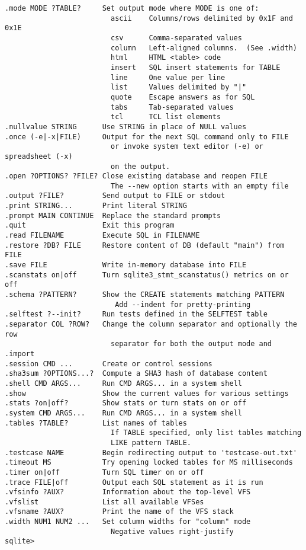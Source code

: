 \begin{verbatim}
.mode MODE ?TABLE?     Set output mode where MODE is one of:
                         ascii    Columns/rows delimited by 0x1F and 0x1E
                         csv      Comma-separated values
                         column   Left-aligned columns.  (See .width)
                         html     HTML <table> code
                         insert   SQL insert statements for TABLE
                         line     One value per line
                         list     Values delimited by "|"
                         quote    Escape answers as for SQL
                         tabs     Tab-separated values
                         tcl      TCL list elements
.nullvalue STRING      Use STRING in place of NULL values
.once (-e|-x|FILE)     Output for the next SQL command only to FILE
                         or invoke system text editor (-e) or spreadsheet (-x)
                         on the output.
.open ?OPTIONS? ?FILE? Close existing database and reopen FILE
                         The --new option starts with an empty file
.output ?FILE?         Send output to FILE or stdout
.print STRING...       Print literal STRING
.prompt MAIN CONTINUE  Replace the standard prompts
.quit                  Exit this program
.read FILENAME         Execute SQL in FILENAME
.restore ?DB? FILE     Restore content of DB (default "main") from FILE
.save FILE             Write in-memory database into FILE
.scanstats on|off      Turn sqlite3_stmt_scanstatus() metrics on or off
.schema ?PATTERN?      Show the CREATE statements matching PATTERN
                          Add --indent for pretty-printing
.selftest ?--init?     Run tests defined in the SELFTEST table
.separator COL ?ROW?   Change the column separator and optionally the row
                         separator for both the output mode and .import
.session CMD ...       Create or control sessions
.sha3sum ?OPTIONS...?  Compute a SHA3 hash of database content
.shell CMD ARGS...     Run CMD ARGS... in a system shell
.show                  Show the current values for various settings
.stats ?on|off?        Show stats or turn stats on or off
.system CMD ARGS...    Run CMD ARGS... in a system shell
.tables ?TABLE?        List names of tables
                         If TABLE specified, only list tables matching
                         LIKE pattern TABLE.
.testcase NAME         Begin redirecting output to 'testcase-out.txt'
.timeout MS            Try opening locked tables for MS milliseconds
.timer on|off          Turn SQL timer on or off
.trace FILE|off        Output each SQL statement as it is run
.vfsinfo ?AUX?         Information about the top-level VFS
.vfslist               List all available VFSes
.vfsname ?AUX?         Print the name of the VFS stack
.width NUM1 NUM2 ...   Set column widths for "column" mode
                         Negative values right-justify
sqlite>

\end{verbatim}


